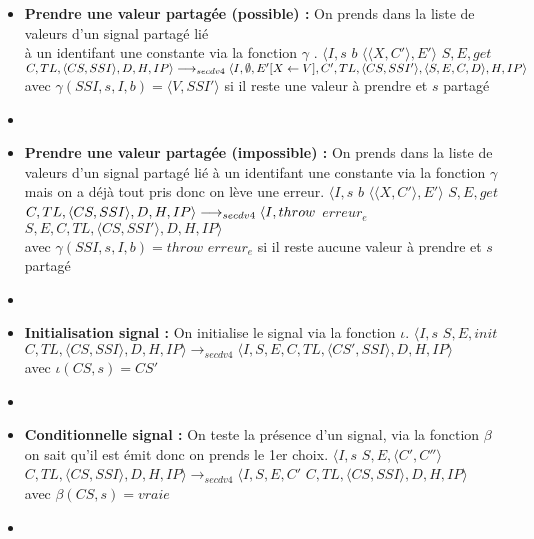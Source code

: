 \documentclass[10pt,a4paper]{article}
\begin{document}
\begin{enumerate}
\begin{itemize}
						\item[] \textbf{Prendre une valeur partagée (possible) :} On prends dans la liste de valeurs d'un signal partagé lié \\
						à un identifant une constante via la fonction $\gamma$ .
						\smallbreak
						$\langle I,s$ $b$ $\langle\langle X,C'\rangle,E'\rangle$ $S,E,get$ $C,TL,\langle CS,SSI\rangle,D,H,IP\rangle 
						\\\longrightarrow_{secdv4} \langle I,\emptyset,E'[X \leftarrow V],C',TL,\langle CS,SSI'\rangle,\langle S,E,C,D\rangle,H,IP\rangle$\\
						avec $ \gamma(SSI,s,I,b) = \langle V,SSI'\rangle$ si il reste une valeur à prendre et $s$ partagé
						\item[]
						
						\item[] \textbf{Prendre une valeur partagée (impossible) :} On prends dans la liste de valeurs d'un signal partagé lié à un identifant une constante via la fonction $\gamma$ mais on a déjà tout pris donc on lève une erreur.
						\smallbreak 
						$\langle I,s$ $b$ $\langle\langle X,C'\rangle,E'\rangle$ $S,E,get$ $C,TL,\langle CS,SSI\rangle,D,H,IP\rangle 
						\\\longrightarrow_{secdv4} \langle I,throw$ $erreur_{e}$ $S,E,C,TL,\langle CS,SSI'\rangle,D,H,IP\rangle$\\
						avec $ \gamma(SSI,s,I,b) = throw$ $erreur_{e}$ si il reste aucune valeur à prendre et $s$ partagé
						\item[]
						
						\item[] \textbf{Initialisation signal :} On initialise le signal via la fonction $\iota$.
						\smallbreak 
						$\langle I,s$ $S,E,init$ $C,TL,\langle CS,SSI\rangle,D,H,IP\rangle 
						\longrightarrow_{secdv4} \langle I,S,E,C,TL,\langle CS',SSI\rangle,D,H,IP\rangle$\\
						avec $\iota(CS,s) = CS'$
						\item[]	
						
						\item[] \textbf{Conditionnelle signal :} On teste la présence d'un signal, via la fonction $\beta$ on sait qu'il est émit donc on prends le 1er choix.
						\smallbreak
						$\langle I,s$ $S,E,\langle C',C''\rangle$ $C,TL,\langle CS,SSI\rangle,D,H,IP\rangle 
						\longrightarrow_{secdv4} \langle I,S,E,C'$ $C,TL,\langle CS,SSI\rangle,D,H,IP\rangle$ \\
						avec $\beta(CS,s) = vraie$
						\item[]
						

\end{itemize}
\end{enumerate}
\end{document}
